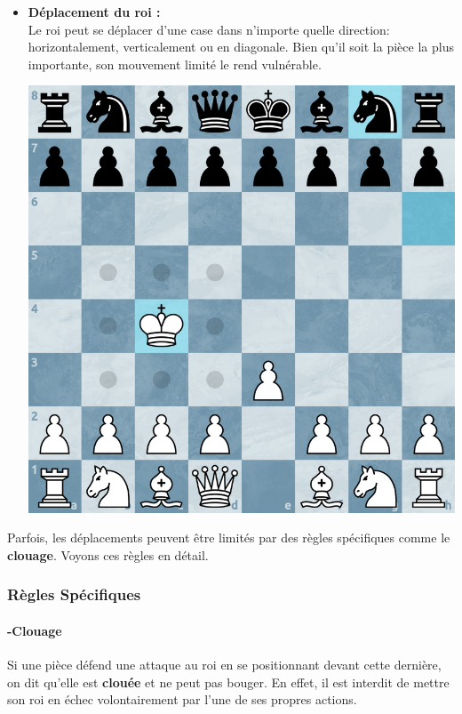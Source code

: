 \documentclass{article}
\begin{document}
\begin{itemize}
    \item \begin{minipage}{0.45\textwidth}
        \textbf{Déplacement du roi :} \\
        Le roi peut se déplacer d'une case dans n'importe quelle direction: horizontalement, verticalement ou en diagonale.
        Bien qu'il soit la pièce la plus importante, son mouvement limité le rend vulnérable.
    \end{minipage}
    \hspace{0.05\textwidth}
    \begin{minipage}{0.45\textwidth}
        \centering
        \includegraphics[width=\textwidth]{roiMove.png}
    \end{minipage}

\end{itemize}

\vspace{0.5cm}

Parfois, les déplacements peuvent être limités par des règles spécifiques comme le \textbf{clouage}. Voyons ces règles en détail.

\subsubsection{Règles Spécifiques}
\paragraph{-Clouage} Si une pièce défend une attaque au roi en se positionnant devant cette dernière, on dit qu'elle est \textbf{clouée}
 et ne peut pas bouger. En effet, il est interdit de mettre son roi en échec volontairement par l'une de ses propres actions.
\end{document}
